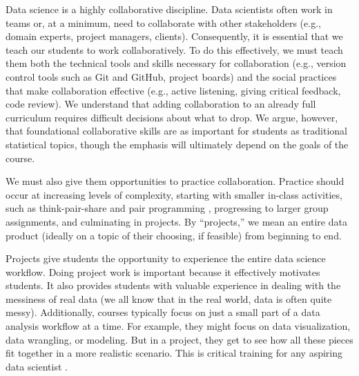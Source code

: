\documentclass[
  10pt,
  letterpaper,
]{article}
\begin{document}
Data science is a highly collaborative discipline. Data scientists often
work in teams or, at a minimum, need to collaborate with other
stakeholders (e.g., domain experts, project managers, clients).
Consequently, it is essential that we teach our students to work
collaboratively. To do this effectively, we must teach them both the
technical tools and skills necessary for collaboration (e.g., version
control tools such as Git and GitHub, project boards) and the social
practices that make collaboration effective (e.g., active listening,
giving critical feedback, code review). We understand that adding
collaboration to an already full curriculum requires difficult decisions
about what to drop. We argue, however, that foundational collaborative
skills are as important for students as traditional statistical topics,
though the emphasis will ultimately depend on the goals of the course.

We must also give them opportunities to practice collaboration. Practice
should occur at increasing levels of complexity, starting with smaller
in-class activities, such as think-pair-share
\citep{lyman1981responsive} and pair programming \citep{HANNAY20091110},
progressing to larger group assignments, and culminating in projects. By
``projects,'' we mean an entire data product (ideally on a topic of
their choosing, if feasible) from beginning to end.

Projects give students the opportunity to experience the entire data
science workflow. Doing project work is important because it effectively
motivates students. It also provides students with valuable experience
in dealing with the messiness of real data (we all know that in the real
world, data is often quite messy). Additionally, courses typically focus
on just a small part of a data analysis workflow at a time. For example,
they might focus on data visualization, data wrangling, or modeling. But
in a project, they get to see how all these pieces fit together in a
more realistic scenario. This is critical training for any aspiring data
scientist \citep{ccetinkaya20225ws}.
\end{document}
